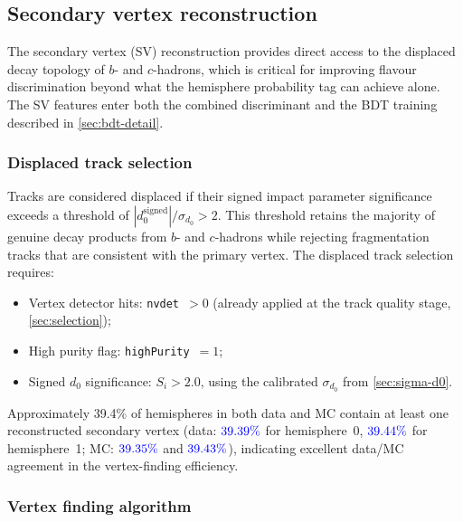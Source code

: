 \documentclass[11pt,a4paper]{article}
\newcommand{\measured}[1]{\textcolor{blue}{#1}}
\begin{document}
\subsection{Secondary vertex reconstruction}
\label{sec:sv-reco}

The secondary vertex (SV) reconstruction provides direct access to the
displaced decay topology of $b$- and $c$-hadrons, which is critical for
improving flavour discrimination beyond what the hemisphere probability tag
can achieve alone.  The SV features enter both the combined discriminant
and the BDT training described in \cref{sec:bdt-detail}.

\subsubsection{Displaced track selection}

Tracks are considered displaced if their signed impact parameter significance
exceeds a threshold of $|d_0^\mathrm{signed}|/\sigma_{d_0} > 2$.  This
threshold retains the majority of genuine decay products from $b$- and
$c$-hadrons while rejecting fragmentation tracks that are consistent with
the primary vertex.  The displaced track selection requires:
\begin{itemize}
\item Vertex detector hits: \texttt{nvdet}~$> 0$ (already applied at the
  track quality stage, \cref{sec:selection});
\item High purity flag: \texttt{highPurity}~$= 1$;
\item Signed $d_0$ significance: $S_i > 2.0$, using the calibrated
  $\sigma_{d_0}$ from \cref{sec:sigma-d0}.
\end{itemize}

Approximately 39.4\% of hemispheres in both data and MC contain at least
one reconstructed secondary vertex (data: $\measured{39.39\%}$ for
hemisphere~0, $\measured{39.44\%}$ for hemisphere~1; MC: $\measured{39.35\%}$
and $\measured{39.43\%}$), indicating excellent data/MC agreement in the
vertex-finding efficiency.

\subsubsection{Vertex finding algorithm}
\end{document}
